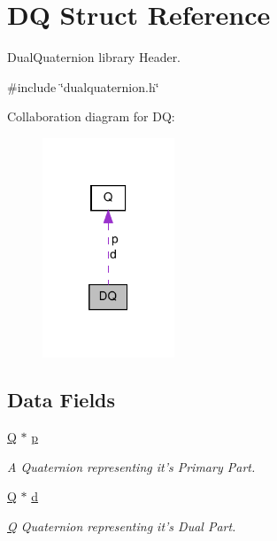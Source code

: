 \hypertarget{structDQ}{\section{D\-Q Struct Reference}
\label{structDQ}
}


Dual\-Quaternion library Header.  




{\ttfamily \#include \char`\"{}dualquaternion.\-h\char`\"{}}



Collaboration diagram for D\-Q\-:\nopagebreak
\begin{figure}[H]
\begin{center}
\leavevmode
\includegraphics[width=112pt]{structDQ__coll__graph}
\end{center}
\end{figure}
\subsection*{Data Fields}
\begin{DoxyCompactItemize}
\item 
\hyperlink{structQ}{Q} $\ast$ \hyperlink{structDQ_a878210bff170f4392d6cbe2d4704ffdc}{p}
\begin{DoxyCompactList}\small\item\em A Quaternion representing it's Primary Part. \end{DoxyCompactList}\item 
\hyperlink{structQ}{Q} $\ast$ \hyperlink{structDQ_a535cdb52876521fd6abbfcf211a7c702}{d}
\begin{DoxyCompactList}\small\item\em \hyperlink{structQ}{Q} Quaternion representing it's Dual Part. \end{DoxyCompactList}\end{DoxyCompactItemize}


